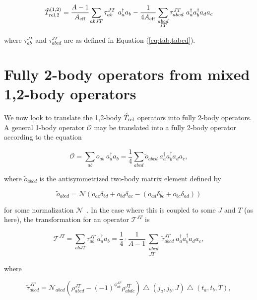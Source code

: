 \documentclass{article}
\def\aeff{A_{\rm{eff}}}
\def\trelop{\hat{T}_{\rm{rel}}}
\def\trelopi_#1^#2{\hat{T}_{\rm{rel}, #1}^{#2}}
\def\creop{a^{\dagger}}
\def\annop{a}
\begin{document}
\begin{equation}\label{eq:trel2op1,2}
  \trelopi_2^{(1,2)} = \cfrac{A-1}{\aeff}
  \displaystyle\sum_{abJT}\tau_{ab}^{JT}~\creop_a\annop_b
  -\frac{1}{4\aeff} \displaystyle\sum_{\substack{abcd\\JT}}
  \tau_{abcd}^{JT}~\creop_a\creop_b\annop_d\annop_c
\end{equation}

where $\tau_{ab}^{JT}$ and $\tau_{abcd}^{JT}$ are as defined in Equation
(\ref{eq:tab,tabcd}).


\section{Fully 2-body operators from mixed 1,2-body operators}
We now look to translate the 1,2-body $\trelop$ operators into fully 2-body
operators. A general 1-body operator $\mathcal{O}$ may be translated into
a fully 2-body operator according to the equation

\begin{equation*}
  \mathcal{O} = \displaystyle\sum_{ab}o_{ab}~\creop_a\annop_b =
  \frac{1}{4}\displaystyle\sum_{abcd}\tilde{o}_{abcd}
  ~\creop_a\creop_b\annop_d\annop_c,
\end{equation*}

where $\tilde{o}_{abcd}$ is the antisymmetrized two-body matrix element
defined by

\begin{equation*}
  \tilde{o}_{abcd} = \mathcal{N}\left(
  o_{ac}\delta_{bd} + o_{bd}\delta_{ac} -
  \left( o_{ad}\delta_{bc} + o_{bc}\delta_{ad} \right)
  \right)
\end{equation*}

for some normalization $\mathcal{N}$~\cite{promoting1to2}.
In the case where this is coupled to some $J$ and $T$ (as here), the
transformation for an operator $\mathcal{T}^{JT}$ is

\begin{equation}\label{eq:12to2}
  \mathcal{T}^{JT} = \displaystyle\sum_{abJT}\tau_{ab}^{JT}~\creop_a\annop_b =
  \frac{1}{4}\cdot\frac{1}{A-1}
  \displaystyle\sum_{\substack{abcd\\JT}}\tilde{\tau}_{abcd}^{JT}
  ~\creop_a\creop_b\annop_d\annop_c,
\end{equation}

where

\begin{equation}\label{eq:12to2op}
  \tilde{\tau}_{abcd}^{JT} = \mathcal{N}_{abcd} \left(
  \rho_{abcd}^{JT} - {(-1)}^{\phi_{ab}^{JT}}\rho_{abdc}^{JT}
  \right)
  \bigtriangleup\left(j_a, j_b, J\right)
  \bigtriangleup\left(t_a, t_b, T\right),
\end{equation}
\end{document}
